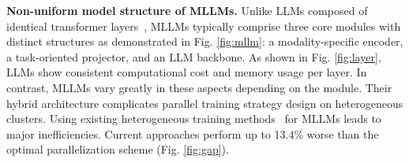 \documentclass[conference]{IEEEtran}
\begin{document}


\textbf{Non-uniform model structure of MLLMs.}
Unlike LLMs composed of identical transformer layers~\cite{vaswani2017attention}, MLLMs typically comprise three core modules with distinct structures as demonstrated in Fig. \ref{fig:mllm}: a modality-specific encoder, a task-oriented projector, and an LLM backbone.
As shown in Fig. \ref{fig:layer}, LLMs show consistent computational cost and memory usage per layer. In contrast, MLLMs vary greatly in these aspects depending on the module.
Their hybrid architecture complicates parallel training strategy design on heterogeneous clusters. Using existing heterogeneous training methods~\cite{jia2022whale,zhouespresso} for MLLMs leads to major inefficiencies. Current approaches perform up to 13.4\% worse than the optimal parallelization scheme (Fig. \ref{fig:gap}).
\end{document}
